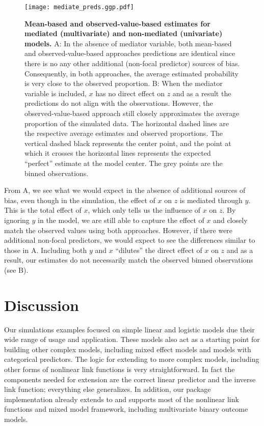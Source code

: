 \begin{figure}
\begin{center}
\texttt{[image: mediate\_preds.ggp.pdf]}
\end{center}
\caption{{\bf Mean-based and observed-value-based estimates for mediated (multivariate) and non-mediated (univariate) models.} A: In the absence of mediator variable, both mean-based and observed-value-based approaches predictions are identical since there is no any other additional (non-focal predictor) sources of bias. Consequently, in both approaches, the average estimated probability is very close to the observed proportion. B: When the mediator variable is included,  $x$ has no direct effect on $z$ and as a result the predictions do not align with the observations. However, the observed-value-based approach still closely approximates the average proportion of the simulated data. The horizontal dashed lines are the respective average estimates and observed proportions. The vertical dashed black represents the center point, and the point at which it crosses the horizontal lines represents the expected ``perfect'' estimate at the model center. The grey points are the binned observations.}
\label{fig:pred_mediated_plots}
\end{figure}

From A, we see what we would expect in the absence of additional sources of bias, even though in the simulation, the effect of $x$ on $z$ is mediated through $y$. This is the total effect of $x$, which only tells us the influence of $x$ on $z$. By ignoring $y$ in the model, we are still able to capture the effect of $x$ and closely match the observed values using both approaches. However, if there were additional non-focal predictors, we would expect to see the differences similar to those in A. Including both $y$ and $x$ ``dilutes'' the direct effect of $x$ on $z$ and as a result, our estimates do not necessarily match the observed binned observations (see B).

\section{Discussion}

Our simulations examples focused on simple linear and logistic models due their wide range of usage and application. These models also act as a starting point for building other complex models, including mixed effect models and models with categorical predictors. The logic for extending to more complex models, including other forms of nonlinear link functions is very straightforward. In fact the components needed for extension are the correct linear predictor and the inverse link function; everything else generalizes. In addition, our  package implementation already extends to and supports most of the nonlinear link functions and mixed model framework, including multivariate binary outcome models.

